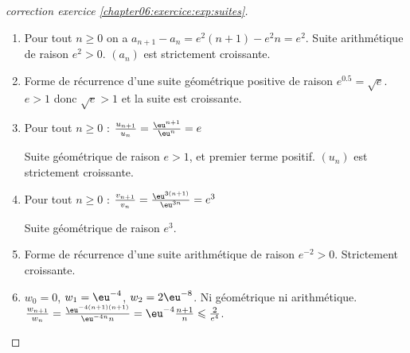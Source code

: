 \documentclass[main.tex]{subfiles}
\begin{document}
\begin{proof}[correction exercice \ref{chapter06:exercice:exp:suites}]  
	\begin{enumerate}[leftmargin=*, label=\arabic*)] 
		\item Pour tout $n\geqslant 0$ on a $a_{n+1}-a_{n}=e^2(n+1)-e^2n=e^2$. Suite arithmétique de  raison $e^2>0$. $(a_n)$ est strictement croissante. 
		\item Forme de récurrence d'une suite géométrique positive de raison $e^{0.5}=\sqrt{e}$. $e>1$ donc $\sqrt{e}>1$ et la suite est croissante.  
			\item Pour tout $n\geqslant 0$ : $\frac{u_{n+1}}{u_n}=\frac{\eu^{n+1}}{\eu^n}=e$
		
		Suite géométrique de raison $e>1$, et premier terme positif. $(u_n)$ est strictement croissante. 
		
		\item Pour tout $n\geqslant 0$ : $\frac{v_{n+1}}{v_n}=\frac{\eu^{3(n+1)}}{\eu^{3n}}=e^3$
		
		Suite géométrique de raison $e^3$.
		\item Forme de récurrence d'une suite arithmétique de raison $e^{-2}>0$. Strictement croissante. 
\item $w_0=0$, $w_1=\eu^{-4}$, $w_2=2\eu^{-8}$. Ni géométrique ni arithmétique. 
		$\frac{w_{n+1}}{w_{n}}=\frac{\eu^{-4(n+1)(n+1)}}{\eu^{-4n}n}=\eu^{-4}\frac{n+1}{n}\leqslant \frac{2}{e^4}$. 
	\end{enumerate}
\end{proof}	
%
% 
%  
%  
%  	 
\end{document}
